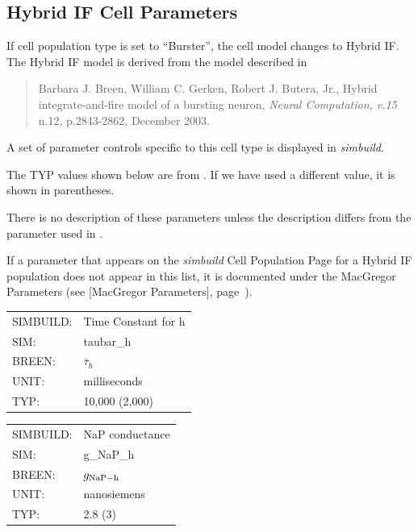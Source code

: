 \documentclass[12pt,openany,oneside]{book}
\newcommand{\ticite}[1]{\textit{#1}}
\newcommand{\tipxref}[1]{see [#1], page~\pageref{#1}}
\newcommand{\prog}[1]{\textit{{#1}}}
\newcommand{\inquotes}[1]{{{``#1''}}}
\begin{document}
\subsection{Hybrid IF Cell Parameters}
\label{Hybrid Integrate and Fire (IF) Parameters}
If cell population type is set to \inquotes{Burster},
the cell model changes to Hybrid IF. The
Hybrid IF model is derived from the model described in
\begin{quote}
\label{Breen et al} Barbara J. Breen, William C. Gerken, Robert
J. Butera, Jr., Hybrid integrate-and-fire model of a bursting neuron,
\ticite{Neural Computation, v.15} n.12, p.2843-2862, December 2003.
\end{quote}

A set of parameter controls specific to this cell type is displayed
in \prog{simbuild}.

\noindent The TYP values shown below are from \citet {breenhybrid2003}. 
If we have
used a different value, it is shown in parentheses.

There is no description of these parameters unless the description
differs from the parameter used in \citet {breenhybrid2003}. 

If a parameter that appears on the \prog{simbuild} Cell Population 
Page for a Hybrid IF population does not appear in this list, it is
documented under the MacGregor Parameters (\tipxref{MacGregor Parameters}).

\begin{flushleft}
\begin{tabular}{@{}ll@{}}
SIMBUILD: & Time Constant for h\\
SIM: & taubar\_h\\
BREEN: & $\bar\tau_h$\\
UNIT: & milliseconds\\
TYP: & 10,000 (2,000)\\
\end{tabular}
\end{flushleft}
\filbreak
\vspace{\baselineskip}

\begin{flushleft}
\begin{tabular}{@{}ll@{}}
SIMBUILD: & NaP conductance\\
SIM: & g\_NaP\_h\\
BREEN: & $g_{\rm NaP-h}$\\
UNIT: & nanosiemens\\
TYP: & 2.8 (3)\\
\end{tabular}
\end{flushleft}
\filbreak
\vspace{\baselineskip}
\end{document}

